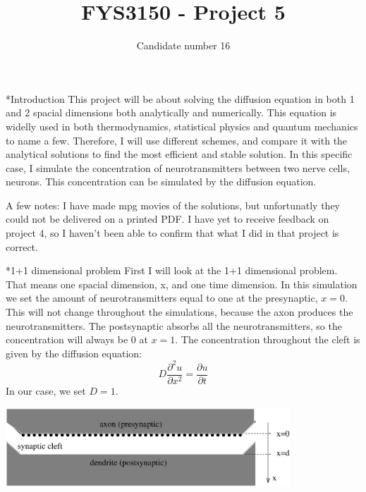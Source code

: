 \documentclass[a4paper, 12pt, titlepage]{article}
\author{Candidate number 16}
\title{FYS3150 - Project 5}
\newcommand{\beq}{\begin{equation*}}
\newcommand{\eeq}{\end{equation*}}
\newcommand{\pa}{\partial}
\begin{document}
 \maketitle
 \newpage
 
 \begin{section}*{Introduction}
  This project will be about solving the diffusion equation in both 1 and 2 spacial dimensions both 
  analytically and numerically. This equation is widelly used in both thermodynamics, statistical physics and
  quantum mechanics to name a few. Therefore, I will use different schemes, and compare it with the analytical
  solutions to find the most efficient and stable solution. In this specific case, I simulate
  the concentration of neurotransmitters between two nerve cells, neurons. This concentration can be simulated
  by the diffusion equation. 
  
  A few notes: I have made mpg movies of the solutions, but unfortunatly they could not be delivered on a 
  printed PDF. I have yet to receive feedback on project 4, so I haven't been able to confirm that what I did
  in that project is correct. 
 \end{section}

 \begin{section}*{1+1 dimensional problem}
  First I will look at the 1+1 dimensional problem. That means one spacial dimension, x, and one time 
  dimension. In this simulation we set the amount of neurotransmitters equal to one at the presynaptic,
  $x=0$. This will not change throughout the simulations, because the axon produces the neurotransmitters.
  The postsynaptic absorbs all the neurotransmitters, so the concentration will always be 0 at $x=1$. 
  The concentration throughout the cleft is given by the diffusion equation:
  \beq D\frac{\pa^2 u}{\pa x^2} = \frac{\pa u}{\pa t} \eeq
  In our case, we set $D=1$. 
 
  \includegraphics[width=0.8\textwidth]{build-main-Desktop-Debug/synaptic_cleft.eps}{\centering}
 
 \end{section} 
 
\end{document}
